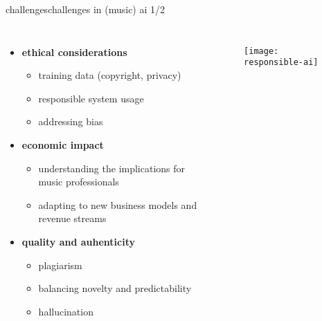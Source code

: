 \begin{frame}{challenges}{challenges in (music) ai 1/2}
    \vspace{-5mm}
    \begin{columns}
        \begin{itemize}
            \item \textbf{ethical considerations}
                \begin{itemize}
                    \item training data (copyright, privacy)
                    \item responsible system usage
                    \item addressing bias
                \end{itemize}
            \smallskip
            \item \textbf{economic impact}
                \begin{itemize}
                    \item understanding the implications for music professionals
                    \item adapting to new business models and revenue streams
                \end{itemize}
            \smallskip
            \item   \textbf{quality and auhenticity}
                \begin{itemize}
                    \item plagiarism
                    \item balancing novelty and predictability
                    \item hallucination
                \end{itemize}
            \smallskip
        \end{itemize}
        \vspace{20mm}
        \begin{figure}%
            \texttt{[image: responsible-ai]}%
        \end{figure}
    \end{columns}
\end{frame}

